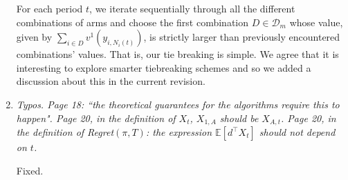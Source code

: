 \documentclass[11pt]{article}
\newcommand{\1}{\ensuremath{\mathbf{1}}} %
\theoremstyle{thm-sf}
\begin{document}
\begin{enumerate}
		For each period $t$, we iterate sequentially through all the different combinations of arms and choose the first combination $D \in \mathcal D_m$ whose value, given by $\sum_{i \in D} v^1(y_{i,N_i(t)})$, is strictly larger than previously encountered combinations' values. That is, our tie breaking is simple.
		We agree that it is interesting to explore smarter tiebreaking schemes and so we added a discussion about this in the current revision.
			
		\item {\it Typos. Page 18: ``the theoretical guarantees for the algorithms require this to happen". Page
		20, in the definition of $X_t$, $X_{1,A}$ should be $X_{A,t}$. Page 20, in the definition of Regret$(\pi,T)$: the expression $\mathbb{E}[d^\top X_t]$ should not depend on $t$.}
	
		Fixed.
	\end{enumerate}
	





 
\end{document}
